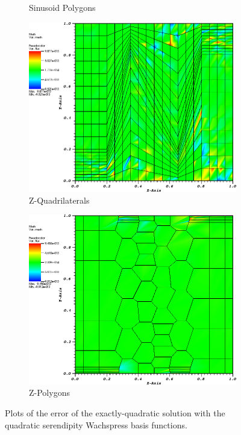 \begin{figure}
{\begin{subfigure}[b]{0.465\textwidth}
		\caption{Sinusoid Polygons}
	\end{subfigure}
}
\vspace{3mm}
{
	\begin{subfigure}[b]{0.465\textwidth}
		\centering
		\label{subfig::z_quad_me_k2_lin_sol}
		\includegraphics[width=\textwidth]{figures/sec_BF/quad_err_zquad_Wach2.png}
		\caption{Z-Quadrilaterals}
	\end{subfigure}
	\hfill
	\begin{subfigure}[b]{0.465\textwidth}
		\centering
		\label{subfig::z_poly_me_k2_lin_sol}
		\includegraphics[width=\textwidth]{figures/sec_BF/quad_err_zpoly_Wach2.png}
		\caption{Z-Polygons}
	\end{subfigure}
}
\caption{Plots of the error of the exactly-quadratic solution with the quadratic serendipity Wachspress basis functions.}
\label{fig::BF_Results_quad_err_Wach2}
\end{figure}

